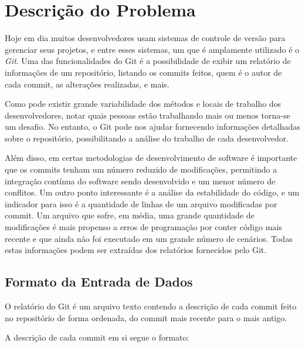




\cabecalho

\section{Descrição do Problema}

Hoje em dia muitos desenvolvedores usam sistemas de controle de versão para gerenciar
seus projetos, e entre esses sistemas, um que é amplamente utilizado é o \textit{Git}.
Uma das funcionalidades do Git é a possibilidade de exibir um relatório de informações 
de um repositório, listando os commits feitos, quem é o autor de cada commit, as alterações
realizadas, e mais.

Como pode existir grande variabilidade dos métodos e locais de trabalho dos desenvolvedores,
notar quais pessoas estão trabalhando mais ou menos torna-se um desafio. No entanto, o Git
pode nos ajudar fornecendo informações detalhadas sobre o repositório, possibilitando a
análise do trabalho de cada desenvolvedor.

Além disso, em certas metodologias de desenvolvimento de software é importante que os 
commits tenham um número reduzido de modificações, permitindo a integração contínua
do software sendo desenvolvido e um menor número de conflitos. Um outro ponto interessante
é a análise da estabilidade do código, e um indicador para isso é a quantidade de linhas
de um arquivo modificadas por commit. Um arquivo que sofre, em média, uma grande quantidade
de modificações é mais propenso a erros de programação por conter código mais recente e que
ainda não foi executado em um grande número de cenários. Todas estas informações podem ser
extraídas dos relatórios fornecidos pelo Git.

\subsection{Formato da Entrada de Dados}

O relatório do Git é um arquivo texto contendo a descrição de cada commit feito no repositório
de forma ordenada, do commit mais recente para o mais antigo.

A descrição de cada commit em si segue o formato:

